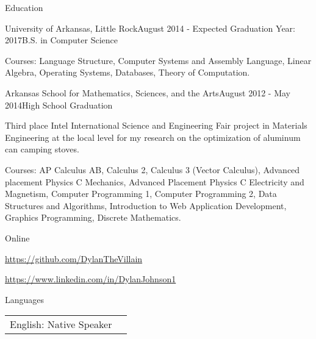 \documentclass{resume} %
\newcommand{\btab}[2]{
	\bgroup
	\def\arraystretch{#1}
	\begin{tabular}{#2}
}
\newcommand{\etab}{
	\end{tabular} \smallskip
	\egroup
}
\begin{document}
\begin{rSection}{Education}

\begin{rSubsection}{University of Arkansas, Little Rock}{August 2014 - Expected Graduation Year: 2017}{B.S. in Computer Science}

	\item Courses: Language Structure, Computer Systems and Assembly Language, Linear Algebra, Operating Systems, Databases, Theory of Computation.
\end{rSubsection}

\begin{rSubsection}{Arkansas School for Mathematics, Sciences, and the Arts}{August 2012 - May 2014}{High School Graduation}

	\item Third place Intel International Science and Engineering Fair project in Materials Engineering at the local level for my research on the optimization of aluminum can camping stoves.
	\item Courses: AP Calculus AB, Calculus 2, Calculus 3 (Vector Calculus), Advanced placement Physics C Mechanics, Advanced Placement Physics C Electricity and Magnetism, Computer Programming 1, Computer Programming 2, Data Structures and Algorithms, Introduction to Web Application Development, Graphics Programming, Discrete Mathematics.
\end{rSubsection}

\end{rSection}

\begin{rSection}{Online}

	\item {\href{https://github.com/DylanTheVillain}{https://github.com/DylanTheVillain}}
	\item {\href{https://www.linkedin.com/in/DylanJohnson1}{https://www.linkedin.com/in/DylanJohnson1}}
\end{rSection}

\begin{rSection}{Languages}

\btab{1.1}{ l l }
	English: Native Speaker
\etab

\end{rSection}

\clearpage
\end{document}

